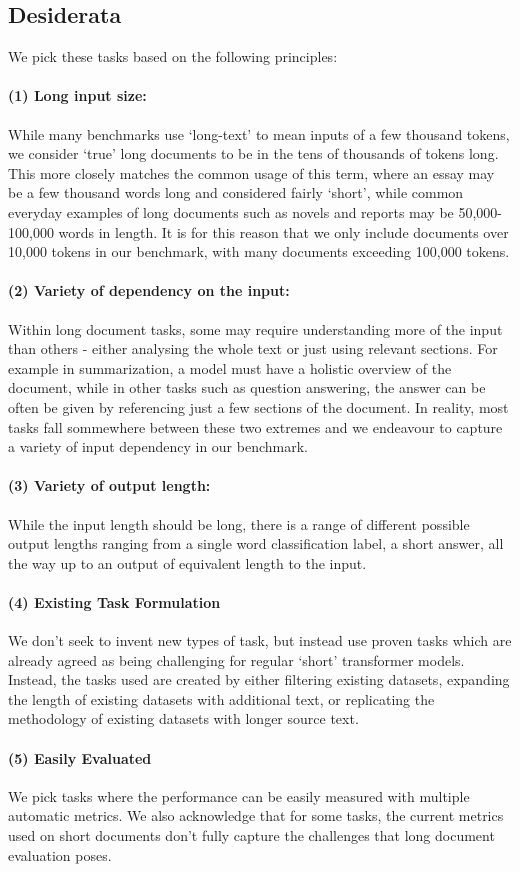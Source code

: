 \documentclass[10pt, a4paper]{article}
\begin{document}
\subsection{Desiderata}
We pick these tasks based on the following principles: \paragraph{(1) Long input size:} While many benchmarks use `long-text' to mean inputs of a few thousand tokens, we consider `true' long documents to be in the tens of thousands of tokens long. This more closely matches the common usage of this term, where an essay may be a few thousand words long and considered fairly `short', while common everyday examples of long documents such as novels and reports may be 50,000-100,000 words in length. It is for this reason that we only include documents over 10,000 tokens in our benchmark, with many documents exceeding 100,000 tokens. \paragraph{(2) Variety of dependency on the input:} Within long document tasks, some may require understanding more of the input than others - either analysing the whole text or just using relevant sections. For example in summarization, a model must have a holistic overview of the document, while in other tasks such as question answering, the answer can be often be given by referencing just a few sections of the document. In reality, most tasks fall sommewhere between these two extremes and we endeavour to capture a variety of input dependency in our benchmark. \paragraph{(3) Variety of output length:} While the input length should be long, there is a range of different possible output lengths ranging from a single word classification label, a short answer, all the way up to an output of equivalent length to the input. \paragraph{(4) Existing Task Formulation} We don't seek to invent new types of task, but instead use proven tasks which are already agreed as being challenging for regular `short' transformer models. Instead, the tasks used are created by either filtering existing datasets, expanding the length of existing datasets with additional text, or replicating the methodology of existing datasets with longer source text. \paragraph{(5) Easily Evaluated} We pick tasks where the performance can be easily measured with multiple automatic metrics. We also acknowledge that for some tasks, the current metrics used on short documents don't fully capture the challenges that long document evaluation poses. 
\end{document}
